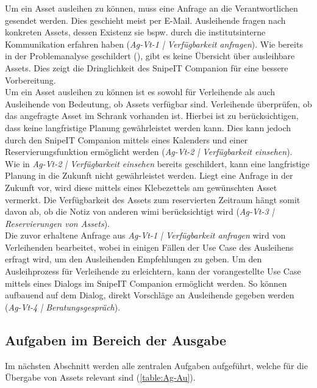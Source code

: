 Um ein Asset ausleihen zu können, muss eine Anfrage an die Verantwortlichen
gesendet werden. Dies geschieht meist per E-Mail. Ausleihende fragen nach
konkreten Assets, dessen Existenz sie bspw. durch die institutsinterne
Kommunikation erfahren haben (\textit{Ag-Vt-1 | Verfügbarkeit anfragen}).
Wie bereits in der Problemanalyse
geschildert (), gibt es keine Übersicht über
ausleihbare Assets. Dies zeigt die Dringlichkeit des SnipeIT Companion für eine
bessere Vorbereitung.\\
Um ein Asset ausleihen zu können ist es sowohl für Verleihende als auch
Ausleihende von Bedeutung, ob Assets verfügbar sind. Verleihende überprüfen, ob
das angefragte Asset im Schrank vorhanden ist. Hierbei ist zu berücksichtigen,
dass keine langfristige Planung gewährleistet werden kann.  Dies kann jedoch durch den SnipeIT Companion mittels eines
Kalenders und einer Reservierungsfunktion ermöglicht werden (\textit{Ag-Vt-2 |
        Verfügbarkeit einsehen}).\\
Wie in \textit{Ag-Vt-2 | Verfügbarkeit einsehen} bereits geschildert, kann eine
langfristige Planung in die Zukunft nicht gewährleistet werden. Liegt eine
Anfrage in der Zukunft vor, wird diese mittels eines Klebezettels am gewünschten
Asset vermerkt. Die Verfügbarkeit des Assets zum reservierten Zeitraum hängt
somit davon ab, ob die Notiz von anderen \ac{wimi} berücksichtigt wird
(\textit{Ag-Vt-3 | Reservierungen von Assets}). \\
Die zuvor erhaltene Anfrage aus \textit{Ag-Vt-1 | Verfügbarkeit anfragen} wird
von Verleihenden bearbeitet, wobei in einigen Fällen der Use Case des Ausleihens
erfragt wird, um den Ausleihenden Empfehlungen zu geben. Um den Ausleihprozess
für Verleihende zu erleichtern, kann der vorangestellte Use Case mittels eines
Dialogs im SnipeIT Companion ermöglicht werden. So können aufbauend auf dem
Dialog, direkt Vorschläge an Ausleihende gegeben werden (\textit{Ag-Vt-4 |
        Beratungsgespräch}).


\subsection{Aufgaben im Bereich der Ausgabe}
Im nächsten Abschnitt werden alle zentralen Aufgaben aufgeführt, welche für die
Übergabe von Assets relevant sind (\ref{table:Ag-Au}).

